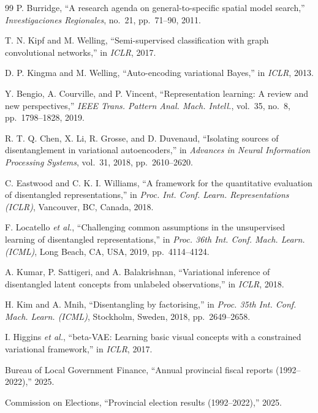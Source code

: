 \documentclass[conference]{IEEEtran}
\begin{document}
\begin{thebibliography}{99}
P. Burridge, ``A research agenda on general-to-specific spatial model search,'' \textit{Investigaciones Regionales}, no.~21, pp.~71--90, 2011.

T. N. Kipf and M. Welling, ``Semi-supervised classification with graph convolutional networks,'' in \textit{ICLR}, 2017.

D. P. Kingma and M. Welling, ``Auto-encoding variational Bayes,'' in \textit{ICLR}, 2013.

Y. Bengio, A. Courville, and P. Vincent, ``Representation learning: A review and new perspectives,'' \textit{IEEE Trans. Pattern Anal. Mach. Intell.}, vol.~35, no.~8, pp.~1798--1828, 2019.

R. T. Q. Chen, X. Li, R. Grosse, and D. Duvenaud, ``Isolating sources of disentanglement in variational autoencoders,'' in \textit{Advances in Neural Information Processing Systems}, vol.~31, 2018, pp.~2610--2620.

C. Eastwood and C. K. I. Williams, ``A framework for the quantitative evaluation of disentangled representations,'' in \textit{Proc. Int. Conf. Learn. Representations (ICLR)}, Vancouver, BC, Canada, 2018.

F. Locatello \textit{et al.}, ``Challenging common assumptions in the unsupervised learning of disentangled representations,'' in \textit{Proc. 36th Int. Conf. Mach. Learn. (ICML)}, Long Beach, CA, USA, 2019, pp.~4114--4124.

A. Kumar, P. Sattigeri, and A. Balakrishnan, ``Variational inference of disentangled latent concepts from unlabeled observations,'' in \textit{ICLR}, 2018.

H. Kim and A. Mnih, ``Disentangling by factorising,'' in \textit{Proc. 35th Int. Conf. Mach. Learn. (ICML)}, Stockholm, Sweden, 2018, pp.~2649--2658.

I. Higgins \textit{et al.}, ``beta-VAE: Learning basic visual concepts with a constrained variational framework,'' in \textit{ICLR}, 2017.

Bureau of Local Government Finance, ``Annual provincial fiscal reports (1992--2022),'' 2025.

Commission on Elections, ``Provincial election results (1992--2022),'' 2025.


\end{thebibliography}
\end{document}
